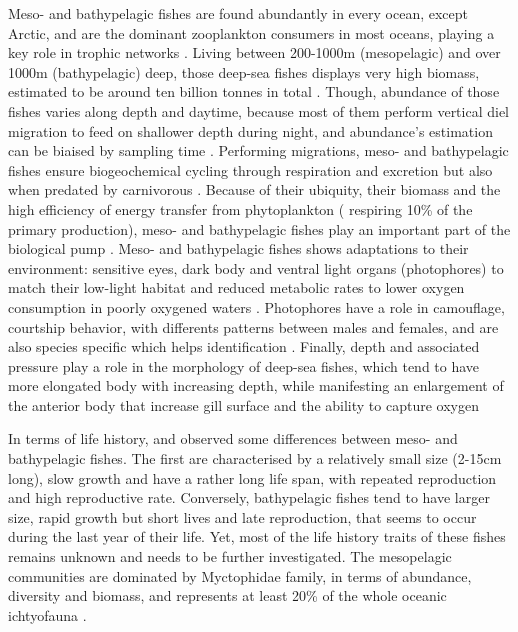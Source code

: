 Meso- and bathypelagic fishes are found abundantly in every ocean, except Arctic, and are the dominant zooplankton consumers in most oceans, playing a key role in trophic networks \citep{davison2015,salvanes2009}. Living between 200-1000m (mesopelagic) and over 1000m (bathypelagic) deep, those deep-sea fishes displays very high biomass, estimated to be around ten billion tonnes in total \citep{garcia2021,gjoesaeter1980,richards2019}. Though, abundance of those fishes varies along depth and daytime, because most of them perform vertical diel migration to feed on shallower depth during night, and abundance's estimation can be biaised by sampling time \citep{catul2011,gaskett2001,garcia2021,pusch2004,salvanes2009}. Performing migrations, meso- and bathypelagic fishes ensure biogeochemical cycling through respiration and excretion but also when predated by carnivorous \citep{garcia2021,spitz2019}. Because of their ubiquity, their biomass and the high efficiency of energy transfer from phytoplankton ( respiring 10\% of the primary production),  meso- and bathypelagic fishes play an important part of the biological pump \citep{garcia2021,spitz2019}.
Meso- and bathypelagic fishes shows adaptations to their environment: sensitive eyes, dark body and ventral light organs (photophores) to match their low-light habitat and reduced metabolic rates to lower oxygen consumption in poorly oxygened waters \citep{salvanes2009,farre2016}. Photophores have a role in camouflage, courtship behavior, with differents patterns between males and females, and are also species specific which helps identification \citep{paitio2020,salvanes2009}. Finally, depth and associated pressure play a role in the morphology of deep-sea fishes, which tend to have more elongated body with increasing depth, while manifesting an enlargement of the anterior body that increase gill surface and the ability to capture oxygen \citep{farre2016}

In terms of life history, \citet{childress1980} and \citet{salvanes2009} observed some differences between meso- and bathypelagic fishes. The first are characterised by a relatively small size (2-15cm long), slow growth and have a rather long life span, with repeated reproduction and high reproductive rate. Conversely, bathypelagic fishes tend to have larger size, rapid growth but short lives and late reproduction, that seems to occur during the last year of their life. Yet, most of the life history traits of these fishes remains unknown and needs to be further investigated. The mesopelagic communities are dominated by Myctophidae family, in terms of abundance, diversity and biomass, and represents at least 20\% of the whole oceanic ichtyofauna \citep{catul2011,kozlov1995,pusch2004}.

